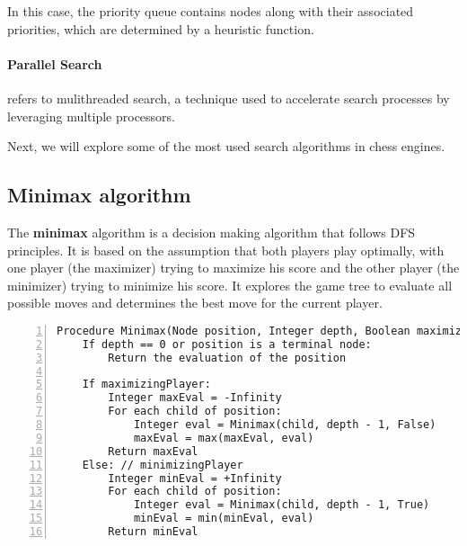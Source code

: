 In this case, the priority queue contains nodes along with their associated priorities, which are determined by a heuristic function.

\paragraph{Parallel Search} refers to mulithreaded search, a technique used to accelerate search processes by leveraging multiple processors.

\vspace{1em}

\noindent Next, we will explore some of the most used search algorithms in chess engines.

\clearpage

\subsection{Minimax algorithm}

The \textbf{minimax} algorithm is a decision making algorithm that follows DFS principles. It is based on the assumption that both players play optimally, with one player (the maximizer) trying to maximize his score and the other player (the minimizer) trying to minimize his score. It explores the game tree to evaluate all possible moves and determines the best move for the current player.

\begin{lstlisting}[caption={Pseudocode of the Minimax algorithm.}, frame=single, numbers=left, xleftmargin=15pt, breaklines=true]
Procedure Minimax(Node position, Integer depth, Boolean maximizingPlayer):
    If depth == 0 or position is a terminal node:
        Return the evaluation of the position

    If maximizingPlayer:
        Integer maxEval = -Infinity
        For each child of position:
            Integer eval = Minimax(child, depth - 1, False)
            maxEval = max(maxEval, eval)
        Return maxEval
    Else: // minimizingPlayer
        Integer minEval = +Infinity
        For each child of position:
            Integer eval = Minimax(child, depth - 1, True)
            minEval = min(minEval, eval)
        Return minEval
\end{lstlisting}

